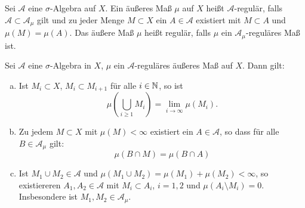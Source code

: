\documentclass[a4paper,twoside,DIV15,BCOR12mm]{scrbook}
\newcommand{\A}{\mathcal A}
\begin{document}
\begin{definition}
Sei $\A$ eine $\sigma$-Algebra auf $X$. Ein äußeres Maß $\mu$ auf $X$ heißt $\A$-regulär, falls $\A\subset \A_\mu$ gilt und zu jeder Menge $M\subset X$ ein $A\in\A$ existiert mit $M\subset A$ und $\mu(M) = \mu(A)$. Das äußere Maß $\mu$ heißt regulär, falls $\mu$ ein $\A_\mu$-reguläres Maß ist.
\end{definition}

\begin{proposition}\label{prop1.3}
Sei $\A$ eine $\sigma$-Algebra in $X$, $\mu$ ein $\A$-reguläres äußeres Maß auf $X$. Dann gilt:
\begin{enumerate}[a)]
\item Ist $M_i\subset X$, $M_i\subset M_{i+1}$ für alle $i\in\mathbb{N}$, so ist
\[
\mu(\bigcup_{i\ge 1}M_i) = \lim_{i\to\infty}\mu(M_i).
\]
\item Zu jedem $M\subset X$ mit $\mu(M)<\infty$ existiert ein $A\in\A$, so dass für alle $B\in \A_\mu$ gilt:
\[
\mu(B\cap M) = \mu(B\cap A)
\]
\item Ist $M_1\cup M_2\in \A$ und $\mu(M_1\cup M_2) = \mu(M_1)+\mu(M_2) <\infty$, so existiereren $A_1,A_2\in\A$ mit $M_i\subset A_i$, $i=1,2$ und $\mu(A_i\setminus M_i) = 0$. Insbesondere ist $M_1,M_2\in \A_\mu$.
\end{enumerate}
\end{proposition}
\end{document}
